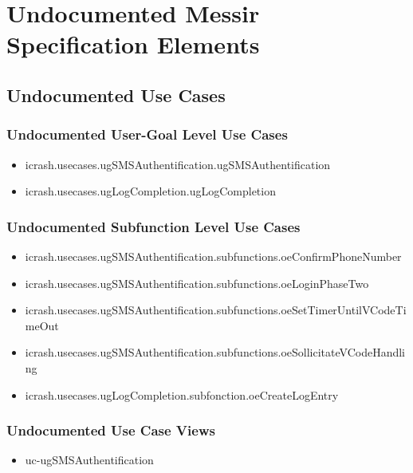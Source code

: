 	
\chapter{Undocumented Messir Specification Elements}


\section[Undocumented Use Cases]{Undocumented Use Cases}


\subsection[Undocumented Use Cases - User-Goal Level]{Undocumented User-Goal Level Use Cases}
\begin{itemize}
\item icrash.usecases.ugSMSAuthentification.ugSMSAuthentification 
\item icrash.usecases.ugLogCompletion.ugLogCompletion 
\end{itemize}

\subsection[Undocumented Use Cases - Subfunction Level]{Undocumented Subfunction Level Use Cases}
\begin{itemize}
\item icrash.usecases.ugSMSAuthentification.subfunctions.oeConfirmPhoneNumber 
\item icrash.usecases.ugSMSAuthentification.subfunctions.oeLoginPhaseTwo 
\item icrash.usecases.ugSMSAuthentification.subfunctions.oeSetTimerUntilVCodeTimeOut 
\item icrash.usecases.ugSMSAuthentification.subfunctions.oeSollicitateVCodeHandling 
\item icrash.usecases.ugLogCompletion.subfonction.oeCreateLogEntry 
\end{itemize}

\subsection[Undocumented Use Case Views]{Undocumented Use Case Views}
\begin{itemize}
\item uc-ugSMSAuthentification 
\end{itemize}




